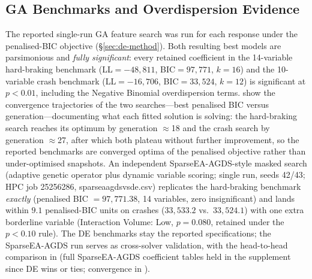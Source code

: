 \documentclass[letterpaper,8pt]{extarticle}  %
\newcommand{\file}[1]{{\ttfamily\def\_{\textunderscore\allowbreak}#1}}
\begin{document}
\begin{doublespacing}
\begin{linenumbers}
\subsection{GA Benchmarks and Overdispersion Evidence}\label{sec:de-results}

The reported single-run GA feature search was run for each response under the penalised-BIC objective (\S\ref{sec:de-method}). Both resulting best models are parsimonious and \emph{fully significant}: every retained coefficient in the 14-variable hard-braking benchmark (LL$=-48{,}811$, BIC$=97{,}771$, $k=16$) and the 10-variable crash benchmark (LL$=-16{,}706$, BIC$=33{,}524$, $k=12$) is significant at $p<0.01$, including the Negative Binomial overdispersion terms.  show the convergence trajectories of the two searches---best penalised BIC versus generation---documenting what each fitted solution is solving: the hard-braking search reaches its optimum by generation $\approx$18 and the crash search by generation $\approx$27, after which both plateau without further improvement, so the reported benchmarks are converged optima of the penalised objective rather than under-optimised snapshots. An independent SparseEA-AGDS-style masked search (adaptive genetic operator plus dynamic variable scoring; single run, seeds 42/43; HPC job 25256286, \file{sparseaagds\_vs\_de.csv}) replicates the hard-braking benchmark \emph{exactly} (penalised BIC $=97{,}771.38$, 14 variables, zero insignificant) and lands within $9.1$ penalised-BIC units on crashes ($33{,}533.2$ vs.\ $33{,}524.1$) with one extra borderline variable (Interaction Volume: Low, $p=0.080$, retained under the $p<0.10$ rule). The DE benchmarks stay the reported specifications; the SparseEA-AGDS run serves as cross-solver validation, with the head-to-head comparison in  (full SparseEA-AGDS coefficient tables held in the supplement since DE wins or ties; convergence in ).





\FloatBarrier


\end{linenumbers}
\end{doublespacing}
\end{document}
